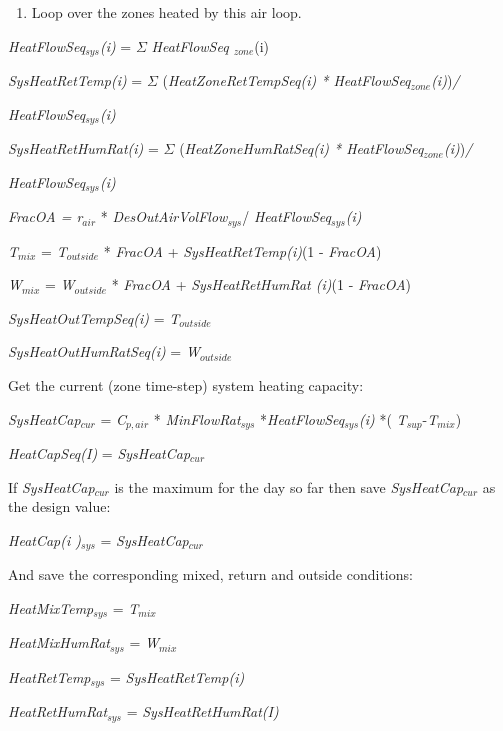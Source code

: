 \begin{enumerate}
\def\labelenumi{(\arabic{enumi})}
\setcounter{enumi}{1}
\tightlist
\item
  Loop over the zones heated by this air loop.
\end{enumerate}

\emph{HeatFlowSeq\(_{sys}\)(i)} = $\Sigma$ \emph{HeatFlowSeq \(_{zone}\)}(i)

\emph{SysHeatRetTemp(i)} = $\Sigma$ (\emph{HeatZoneRetTempSeq(i) * HeatFlowSeq\(_{zone}\)(i)})\emph{/}

\emph{HeatFlowSeq\(_{sys}\)(i)}

\emph{SysHeatRetHumRat(i)} = $\Sigma$ (\emph{HeatZoneHumRatSeq(i) * HeatFlowSeq\(_{zone}\)(i)})\emph{/}

\emph{HeatFlowSeq\(_{sys}\)(i)}

\emph{FracOA = r\(_{air}\)} * \emph{DesOutAirVolFlow\(_{sys}\)}/ \emph{HeatFlowSeq\(_{sys}\)(i)}

\emph{T\(_{mix}\)} = \emph{T\(_{outside}\)} * \emph{FracOA} + \emph{SysHeatRetTemp(i)}(1 - \emph{FracOA})

\emph{W\(_{mix}\)} = \emph{W\(_{outside}\)} * \emph{FracOA} + \emph{SysHeatRetHumRat (i)}(1 - \emph{FracOA})

\emph{SysHeatOutTempSeq(i)} = \emph{T\(_{outside}\)}

\emph{SysHeatOutHumRatSeq(i)} = \emph{W\(_{outside}\)}

Get the current (zone time-step) system heating capacity:

\emph{SysHeatCap\(_{cur}\)} = \emph{C\(_{p,air}\)} * \emph{MinFlowRat\(_{sys}\)} *\emph{HeatFlowSeq\(_{sys}\)(i)} *( \emph{T\(_{sup}\)}-\emph{T\(_{mix}\)})

\emph{HeatCapSeq(I)} = \emph{SysHeatCap\(_{cur}\)}

If \emph{SysHeatCap\(_{cur}\)} is the maximum for the day so far then save \emph{SysHeatCap\(_{cur}\)} as the design value:

\emph{HeatCap(i )\(_{sys}\)} = \emph{SysHeatCap\(_{cur}\)}

And save the corresponding mixed, return and outside conditions:

\emph{HeatMixTemp\(_{sys}\)} = \emph{T\(_{mix}\)}

\emph{HeatMixHumRat\(_{sys}\)} = \emph{W\(_{mix}\)}

\emph{HeatRetTemp\(_{sys}\)} = \emph{SysHeatRetTemp(i)}

\emph{HeatRetHumRat\(_{sys}\)} = \emph{SysHeatRetHumRat(I)}

